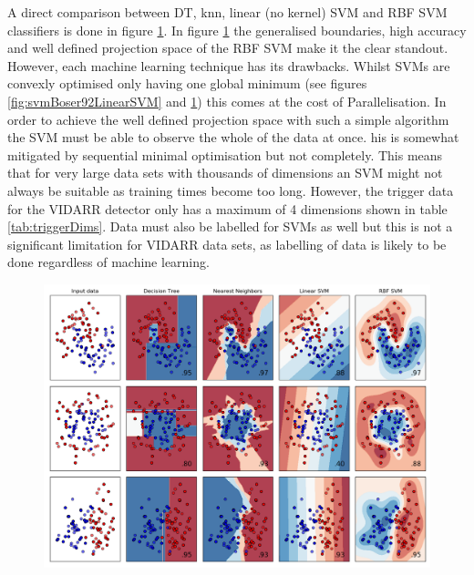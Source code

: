 A direct comparison between DT, knn, linear (no kernel) SVM and RBF SVM classifiers is done in figure \ref{fig:sklearnReleventExamples}. In figure \ref{fig:sklearnReleventExamples} the generalised boundaries, high accuracy and well defined projection space of the RBF SVM make it the clear standout. However, each machine learning technique has its drawbacks. Whilst SVMs are convexly optimised only having one global minimum \cite{Boser92atraining} (see figures \ref{fig:svmBoser92LinearSVM} and \ref{fig:sklearnReleventExamples}) this comes at the cost of Parallelisation. In order to achieve the well defined projection space with such a simple algorithm the SVM must be able to observe the whole of the data at once. his is somewhat mitigated by sequential minimal optimisation \cite{platt1998sequential} but not completely. This means that for very large data sets with thousands of dimensions an SVM might not always be suitable as training times become too long. However, the trigger data for the VIDARR detector only has a maximum of 4 dimensions shown in table \ref{tab:triggerDims}. Data must also be labelled for SVMs as well but this is not a significant limitation for VIDARR data sets, as labelling of data is likely to be done regardless of machine learning.
 
\begin{figure}[!h]
\centering
\includegraphics[width=\linewidth]{Chapter4/Figs/Raster/svmLinAndRbf/sklearnReleventExamples.png}
\label{fig:sklearnReleventExamples}
\end{figure}

